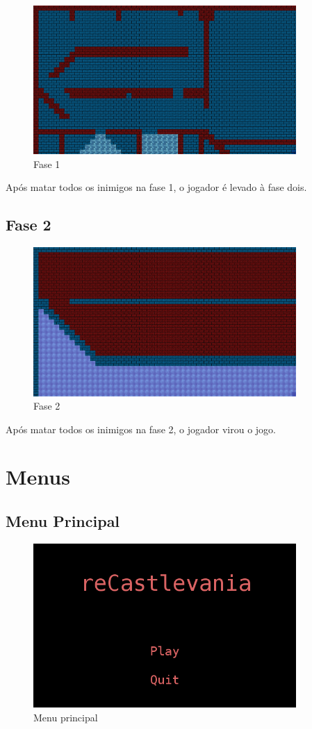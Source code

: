 \documentclass[12pt]{article}
\begin{document}
\begin{figure}[H]
        \centering
        \includegraphics[width=100mm]{map1.png}
        \caption{Fase 1}
        \label{m1}
\end{figure}

Após matar todos os inimigos na fase 1, o jogador é levado à fase dois.

\subsection{Fase 2}

\begin{figure}[H]
        \centering
        \includegraphics[width=100mm]{map2.png}
        \caption{Fase 2}
        \label{m2}
\end{figure}

Após matar todos os inimigos na fase 2, o jogador virou o jogo.

\section{Menus}

\subsection{Menu Principal}

\begin{figure}[H]
\centering
\includegraphics[width=100mm]{mainMenu.png}
\caption{Menu principal}
\label{mm}
\end{figure}
\end{document}
